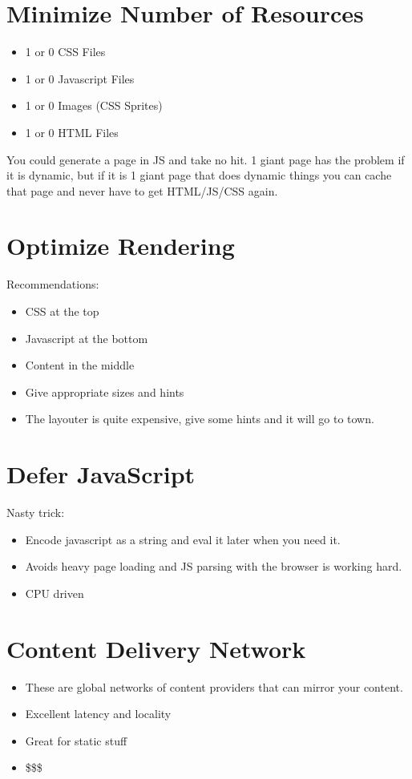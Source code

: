 \documentclass[../CMPUT-404-Notes.tex]{subfiles}
\begin{document}
\section{Minimize Number of Resources}
\begin{itemize}
    \item 1 or 0 CSS Files
    \item 1 or 0 Javascript Files
    \item 1 or 0 Images (CSS Sprites)
    \item 1 or 0 HTML Files
\end{itemize}
You could generate a page in JS and take no hit.
1 giant page has the problem if it is dynamic, but if
it is 1 giant page that does dynamic things you can
cache that page and never have to get HTML/JS/CSS
again.

\section{Optimize Rendering}
Recommendations:
\begin{itemize}
    \item CSS at the top
    \item Javascript at the bottom
    \item Content in the middle
    \item Give appropriate sizes and hints
    \item The layouter is quite expensive, give some hints
    and it will go to town.
\end{itemize}

\section{Defer JavaScript}
Nasty trick:
\begin{itemize}
    \item Encode javascript as a string and eval it later
    when you need it.
    \item Avoids heavy page loading and JS parsing with
    the browser is working hard.
    \item CPU driven
\end{itemize}

\section{Content Delivery Network}
\begin{itemize}
    \item These are global networks of content
    providers that can mirror your content.
    \item Excellent latency and locality
    \item Great for static stuff
    \item \$\$\$
\end{itemize}
    
\end{document}

